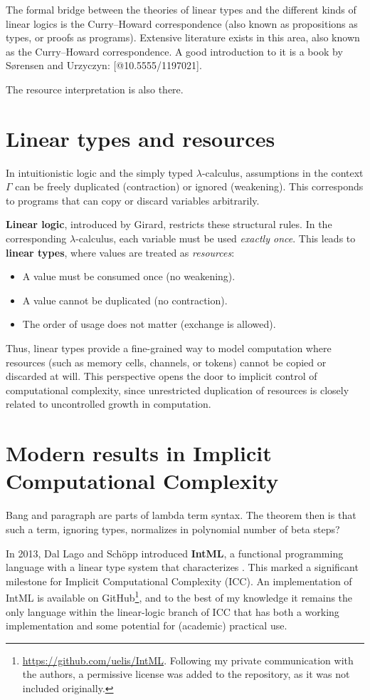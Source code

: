 The formal bridge between the theories of linear types and the different kinds of linear logics is the Curry--Howard correspondence
(also known as propositions as types, or proofs as programs).
Extensive literature exists in this area, also known as the Curry--Howard correspondence. A good introduction to it is a book by S\o{}rensen and Urzyczyn: [@10.5555/1197021].

The resource interpretation is also there.

\section{Linear types and resources}

In intuitionistic logic and the simply typed $\lambda$-calculus, assumptions in the context $\Gamma$ can be freely duplicated (contraction) or ignored (weakening). This corresponds to programs that can copy or discard variables arbitrarily.

\textbf{Linear logic}, introduced by Girard, restricts these structural rules. In the corresponding $\lambda$-calculus, each variable must be used \emph{exactly once}. This leads to \textbf{linear types}, where values are treated as \emph{resources}:
\begin{itemize}[nosep]
  \item A value must be consumed once (no weakening).
  \item A value cannot be duplicated (no contraction).
  \item The order of usage does not matter (exchange is allowed).
\end{itemize}

Thus, linear types provide a fine-grained way to model computation where resources (such as memory cells, channels, or tokens) cannot be copied or discarded at will. This perspective opens the door to implicit control of computational complexity, since unrestricted duplication of resources is closely related to uncontrolled growth in computation.

\section{Modern results in Implicit Computational Complexity}


Bang and paragraph are parts of lambda term syntax. The theorem then is that such a term,
ignoring types, normalizes in polynomial number of beta steps?


In 2013, Dal Lago and Sch\"opp introduced \textbf{IntML}, a functional programming language with a linear type system that characterizes  \cite{DALLAGO2016150}. This marked a significant milestone for Implicit Computational Complexity (ICC). An implementation of IntML is available on GitHub\footnote{\url{https://github.com/uelis/IntML}. Following my private communication with the authors, a permissive license was added to the repository, as it was not included originally.}, and to the best of my knowledge it remains the only language within the linear-logic branch of ICC that has both a working implementation and some potential for (academic) practical use.

